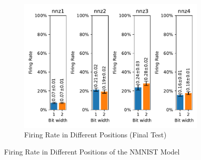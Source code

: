         \begin{figure}[H]
            \centering
            \ContinuedFloat
            \begin{subfigure}[H]{\textwidth}
                \centering
                \includegraphics[width=\textwidth]{../firerate/NMNIST/plots/nmnist_final_firerate.pdf}
                \caption{Firing Rate in Different Positions (Final Test)}
            \end{subfigure}
            \caption{Firing Rate in Different Positions of the NMNIST Model}
        \end{figure}

